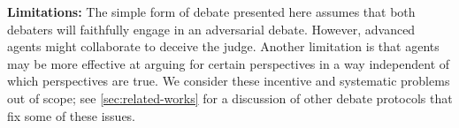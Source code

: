 \documentclass{article}
\begin{document}





\textbf{Limitations:} The simple form of debate presented here assumes that both debaters will faithfully engage in an adversarial debate. However, advanced agents might collaborate to deceive the judge. 
Another limitation is that 
agents may be more effective at arguing for certain perspectives in a way independent of which perspectives are true.  We consider these incentive and systematic problems out of scope; see  \cref{sec:related-works} for a discussion of other debate protocols that fix some of these issues.
\end{document}
